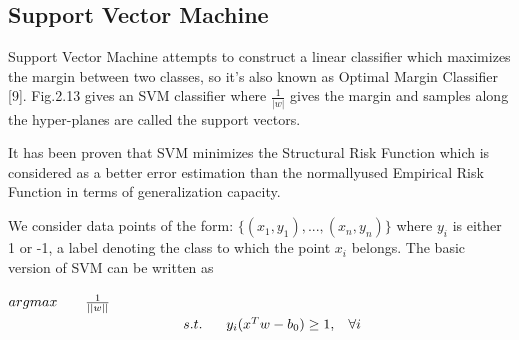 \documentclass[12pt, twoside]{report}
\begin{document}
	\subsection{Support Vector Machine}
	\large{Support Vector Machine attempts to construct a linear classifier which maximizes the margin between two classes, so it’s also known as Optimal Margin Classifier [9]. Fig.2.13 gives an SVM classifier where $\frac{1}{|w|}$ gives the margin and samples along the hyper-planes are called the support vectors.}
	\par
	\large{It has been proven that SVM minimizes the Structural Risk Function which is considered as a better error estimation than the normallyused Empirical Risk Function in terms of generalization capacity.}
	\par
	\large{We consider data points of the form: $\{(x_1,y_1),...,(x_n,y_n)\}$ where $y_i$ is either 1 or -1, a label denoting the class to which the point $x_i$ belongs. The basic version of SVM can be written as}
	\newline
	\begin{center}
		$argmax\hspace{0.7cm}\frac{1}{||w||}$\\
		$\hspace{4.4cm}s.t.\hspace{0.6cm}y_i(x^Tw-b_0)\ge1,\hspace{0.3cm}\forall i$
	\end{center}
	
\end{document}
